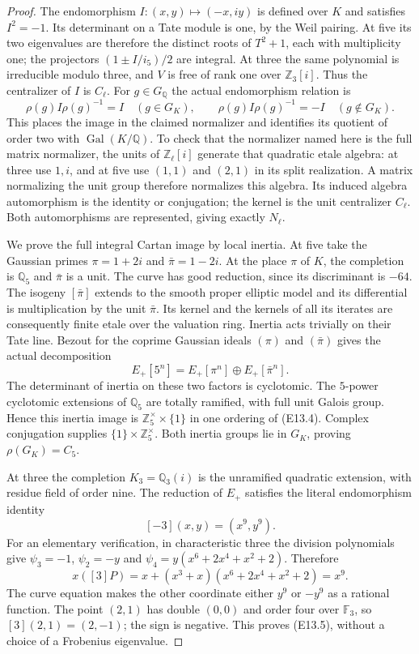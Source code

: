 \documentclass[11pt,oneside]{article}
\begin{document}
\begin{proof}
The endomorphism $I:(x,y)\mapsto(-x,iy)$ is defined over $K$
and satisfies $I^2=-1$.  Its determinant on a Tate module is one,
by the Weil pairing.  At five its two eigenvalues are therefore
the distinct roots of $T^2+1$, each with multiplicity one; the
projectors $(1\pm I/i_5)/2$ are integral.  At three the same
polynomial is irreducible modulo three, and $V$ is free of rank
one over $\mathbb Z_3[i]$.  Thus the centralizer of $I$ is $C_\ell$.
For $g\in G_{\mathbb Q}$ the actual endomorphism relation is
\[
       \rho(g)I\rho(g)^{-1}=I\quad(g\in G_K),\qquad
       \rho(g)I\rho(g)^{-1}=-I\quad(g\notin G_K).
 \tag{E13.3}
\]
This places the image in the claimed normalizer and identifies
its quotient of order two with $\operatorname{Gal}(K/\mathbb Q)$.
To check that the normalizer named here is the full matrix
normalizer, the units of $\mathbb Z_\ell[i]$ generate that
quadratic etale algebra: at three use $1,i$, and at five use
$(1,1)$ and $(2,1)$ in its split realization.
A matrix normalizing the unit group therefore normalizes this
algebra.  Its induced algebra automorphism is the identity or
conjugation; the kernel is the unit centralizer $C_\ell$.
Both automorphisms are represented, giving exactly $N_\ell$.

We prove the full integral Cartan image by local inertia.
At five take the Gaussian primes $\pi=1+2i$ and
$\bar\pi=1-2i$.  At the place $\pi$ of $K$, the completion is
$\mathbb Q_5$ and $\bar\pi$ is a unit.  The curve has good
reduction, since its discriminant is $-64$.  The isogeny
$[\bar\pi]$ extends to the smooth proper elliptic model and its
differential is multiplication by the unit $\bar\pi$.
Its kernel and the kernels of all its iterates are consequently
finite etale over the valuation ring.  Inertia acts trivially on
their Tate line.  Bezout for the coprime Gaussian ideals
$(\pi)$ and $(\bar\pi)$ gives the actual decomposition
\[
 E_+[5^n]=E_+[\pi^n]\oplus E_+[\bar\pi^n].
 \tag{E13.4}
\]
The determinant of inertia on these two factors is cyclotomic.
The $5$-power cyclotomic extensions of $\mathbb Q_5$ are totally
ramified, with full unit Galois group.  Hence this inertia image
is $\mathbb Z_5^\times\times\{1\}$ in one ordering of (E13.4).
Complex conjugation supplies $\{1\}\times\mathbb Z_5^\times$.
Both inertia groups lie in $G_K$, proving $\rho(G_K)=C_5$.

At three the completion $K_3=\mathbb Q_3(i)$ is the unramified
quadratic extension, with residue field of order nine.  The
reduction of $E_+$ satisfies the literal endomorphism identity
\[
          [-3](x,y)=(x^9,y^9).
 \tag{E13.5}
\]
For an elementary verification, in characteristic three the
division polynomials give $\psi_3=-1$, $\psi_2=-y$ and
$\psi_4=y(x^6+2x^4+x^2+2)$.  Therefore
\[
 x([3]P)=x+(x^3+x)(x^6+2x^4+x^2+2)=x^9.
\]
The curve equation makes the other coordinate either $y^9$
or $-y^9$ as a rational function.  The point $(2,1)$ has double
$(0,0)$ and order four over $\mathbb F_3$, so $[3](2,1)=(2,-1)$;
the sign is negative.  This proves (E13.5), without a choice of
a Frobenius eigenvalue.


\end{proof}
\end{document}
